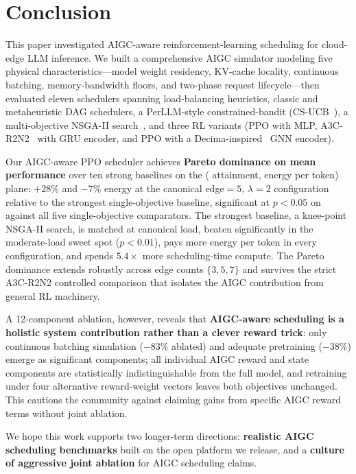 \section{Conclusion}
\label{sec:conclusion}

This paper investigated AIGC-aware reinforcement-learning
scheduling for cloud-edge LLM inference. We built a
comprehensive AIGC simulator modeling five physical
characteristics---model weight residency, KV-cache locality,
continuous batching, memory-bandwidth floors, and two-phase
request lifecycle---then evaluated eleven schedulers spanning
load-balancing heuristics, classic and metaheuristic DAG
schedulers, a PerLLM-style constrained-bandit
(CS-UCB~\cite{yang2024perllm}), a multi-objective NSGA-II
search~\cite{yu2025llmrouting}, and three RL variants (PPO
with MLP, A3C-R2N2~\cite{tuli2022a3cr2n} with GRU encoder,
and PPO with a Decima-inspired~\cite{mao2019decima} GNN
encoder).

Our AIGC-aware PPO scheduler achieves \textbf{Pareto
dominance on mean performance} over ten strong baselines on
the (\slo{}
attainment, energy per token) plane: $+28\%$ \slo{} and
$-7\%$ energy at the canonical edge${=}5$, $\lambda{=}2$
configuration relative to the strongest single-objective
baseline, significant at $p<0.05$ on \slo{} against all
five single-objective comparators. The strongest baseline, a
knee-point NSGA-II search, is matched at canonical load,
beaten significantly in the moderate-load sweet spot
($p<0.01$), pays more energy per token in every
configuration, and spends $5.4\times$ more scheduling-time
compute. The Pareto
dominance extends robustly across edge counts $\{3, 5, 7\}$
and survives the strict A3C-R2N2 controlled comparison that
isolates the AIGC contribution from general RL machinery.

A 12-component ablation, however, reveals that \textbf{AIGC-aware
scheduling is a holistic system contribution rather than a
clever reward trick}: only continuous batching simulation
($-83\%$ \slo{} ablated) and adequate pretraining ($-38\%$)
emerge as significant components; all
individual AIGC reward and state components are statistically
indistinguishable from the full model, and
retraining under four alternative reward-weight vectors
leaves both objectives unchanged.
This cautions the community against claiming gains
from specific AIGC reward terms without joint ablation.

We hope this work supports two longer-term directions:
\textbf{realistic AIGC scheduling benchmarks} built on the
open platform we release, and a \textbf{culture of
aggressive joint ablation} for AIGC scheduling claims.
